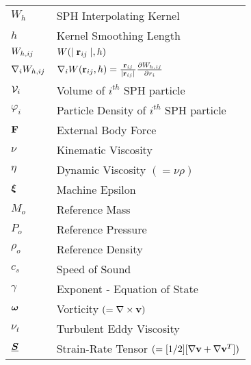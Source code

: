 \begin{longtable}{ll}
$W_{h}$                        & SPH Interpolating Kernel                                                    \\
$h$                            & Kernel Smoothing Length                                                     \\
$\WIJ$                         & $W(\abs{\RIJ}, h)$                                                          \\
$\DWIJ$                        & $\nabla_i W(\RIJ,h) = \frac{\RIJ}{\RtwoIJ[]} \PartialDerivative[r_i]{\WIJ}$ \\
$\Vol_i$                       & Volume of $i^{th}$ SPH particle                                             \\
$\varphi_i$                    & Particle Density of $i^{th}$ SPH particle                                   \\
$\vect{F}$                     & External Body Force                                                         \\
$\nu$                          & Kinematic Viscosity                                                         \\
$\eta$                         & Dynamic Viscosity $(=\nu \rho)$                                             \\
$\MachineEpsilon$              & Machine Epsilon                                                             \\
$M_o$                          & Reference Mass                                                              \\
$P_o$                          & Reference Pressure                                                          \\
$\rho_o$                       & Reference Density                                                           \\
$c_s$                          & Speed of Sound                                                              \\
$\gamma$                       & Exponent - Equation of State                                                \\
$\Vorticity$                   & Vorticity $(=\nabla \times \vect{v})$                                       \\
$\nu_t$                        & Turbulent Eddy Viscosity                                                    \\
$\tensor{S}$                   & Strain-Rate Tensor $(=[1/2][\nabla \vect{v} + \nabla \vect{v}^T])$          \\

\end{longtable}
